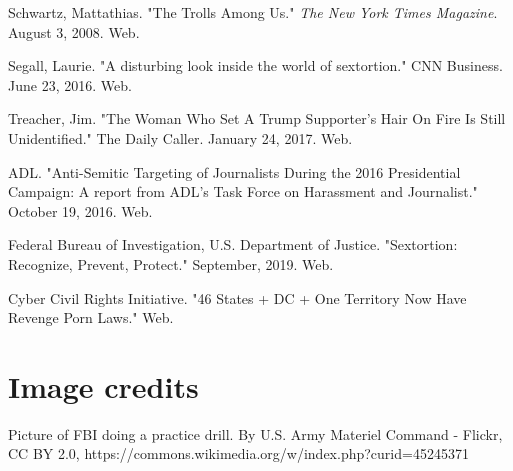 \documentclass[class=book, crop=false]{standalone}
\begin{document}
Schwartz, Mattathias. "The Trolls Among Us." \textit{The New York Times Magazine}. August 3, 2008. Web.

Segall, Laurie. "A disturbing look inside the world of sextortion." CNN Business. June 23, 2016. Web.

Treacher, Jim. "The Woman Who Set A Trump Supporter's Hair On Fire Is Still Unidentified." The Daily Caller. January 24, 2017. Web.

ADL. "Anti-Semitic Targeting of Journalists During the 2016 Presidential Campaign: A report from ADL's Task Force on Harassment and Journalist." October 19, 2016. Web.

Federal Bureau of Investigation, U.S. Department of Justice. "Sextortion: Recognize, Prevent, Protect." September, 2019. Web.

Cyber Civil Rights Initiative. "46 States + DC + One Territory Now Have Revenge Porn Laws." Web.

\section{Image credits}

Picture of FBI doing a practice drill. By U.S. Army Materiel Command - Flickr, CC BY 2.0, https://commons.wikimedia.org/w/index.php?curid=45245371
\end{document}
